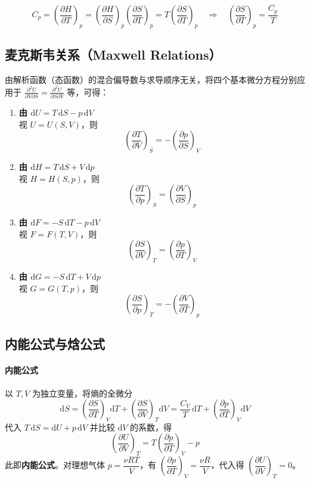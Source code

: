 \documentclass[UTF8]{ctexart}
\begin{document}
\[
C_p=\left(\frac{\partial H}{\partial T}\right)_p
=\left(\frac{\partial H}{\partial S}\right)_p\left(\frac{\partial S}{\partial T}\right)_p
=T\left(\frac{\partial S}{\partial T}\right)_p
\quad\Longrightarrow\quad
\boxed{\left(\frac{\partial S}{\partial T}\right)_p=\frac{C_p}{T}}
\]

\subsection{麦克斯韦关系（Maxwell Relations）}

由解析函数（态函数）的混合偏导数与求导顺序无关，将四个基本微分方程分别应用于
$\displaystyle\frac{\partial^2 U}{\partial V\partial S}=\frac{\partial^2 U}{\partial S\partial V}$ 等，可得：

\begin{enumerate}[leftmargin=2em]
  \item \textbf{由 $\mathrm{d}U=T\,\mathrm{d}S-p\,\mathrm{d}V$}\\
  视 $U=U(S,V)$，则
  \[
  \boxed{\left(\frac{\partial T}{\partial V}\right)_S=-\left(\frac{\partial p}{\partial S}\right)_V}
  \]

  \item \textbf{由 $\mathrm{d}H=T\,\mathrm{d}S+V\,\mathrm{d}p$}\\
  视 $H=H(S,p)$，则
  \[
  \boxed{\left(\frac{\partial T}{\partial p}\right)_S=\left(\frac{\partial V}{\partial S}\right)_p}
  \]

  \item \textbf{由 $\mathrm{d}F=-S\,\mathrm{d}T-p\,\mathrm{d}V$}\\
  视 $F=F(T,V)$，则
  \[
  \boxed{\left(\frac{\partial S}{\partial V}\right)_T=\left(\frac{\partial p}{\partial T}\right)_V}
  \]

  \item \textbf{由 $\mathrm{d}G=-S\,\mathrm{d}T+V\,\mathrm{d}p$}\\
  视 $G=G(T,p)$，则
  \[
  \boxed{\left(\frac{\partial S}{\partial p}\right)_T=-\left(\frac{\partial V}{\partial T}\right)_p}
  \]
\end{enumerate}

\subsection{内能公式与焓公式}

\paragraph{内能公式}
以 $T,V$ 为独立变量，将熵的全微分
\[
\mathrm{d}S=\left(\frac{\partial S}{\partial T}\right)_V\mathrm{d}T
+\left(\frac{\partial S}{\partial V}\right)_T\mathrm{d}V
=\frac{C_V}{T}\,\mathrm{d}T+\left(\frac{\partial p}{\partial T}\right)_V\mathrm{d}V
\]
代入 $T\,\mathrm{d}S=\mathrm{d}U+p\,\mathrm{d}V$ 并比较 $\mathrm{d}V$ 的系数，得
\[
\boxed{\left(\frac{\partial U}{\partial V}\right)_T
=T\left(\frac{\partial p}{\partial T}\right)_V-p}
\]
此即\textbf{内能公式}。对理想气体 $p=\dfrac{\nu RT}{V}$，有 $\left(\dfrac{\partial p}{\partial T}\right)_V=\dfrac{\nu R}{V}$，代入得 $\left(\dfrac{\partial U}{\partial V}\right)_T=0$。
\end{document}
